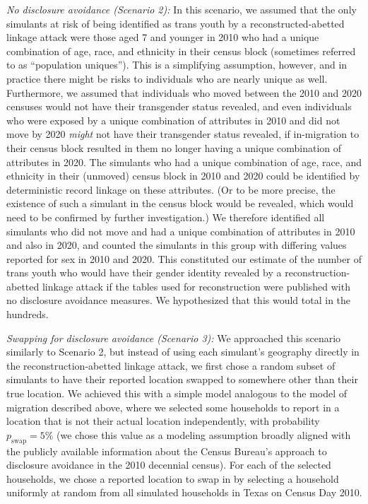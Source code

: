 \documentclass{jpc} %
\theoremstyle{plain}\newtheorem{satz}[thm]{Satz} %
\begin{document}
\emph{No disclosure avoidance (Scenario 2):} In this scenario, we assumed that the only simulants at risk of being identified as trans youth by a reconstructed-abetted linkage attack were those aged 7 and younger in 2010 who had a unique combination of age, race, and ethnicity in their census block (sometimes referred to as ``population uniques'').  This is a simplifying assumption, however, and in practice there might be risks to individuals who are nearly unique as well.  Furthermore, we assumed that individuals who moved between the 2010 and 2020 censuses would not have their transgender status revealed, and even individuals who were exposed by a unique combination of attributes in 2010 and did not move by 2020 \emph{might} not have their transgender status revealed, if in-migration to their census block resulted in them no longer having a unique combination of attributes in 2020.  The simulants who had a unique combination of age, race, and ethnicity in their (unmoved) census block in 2010 and 2020 could be identified by deterministic record linkage on these attributes. (Or to be more precise, the existence of such a simulant in the census block would be revealed, which would need to be confirmed by further investigation.)  We therefore identified all simulants who did not move and had a unique combination of attributes in 2010 and also in 2020, and counted the simulants in this group with differing values reported for sex in 2010 and 2020.  This constituted our estimate of the number of trans youth who would have their gender identity revealed by a reconstruction-abetted linkage attack if the tables used for reconstruction were published with no disclosure avoidance measures.
We hypothesized that this would total in the hundreds.

\emph{Swapping for disclosure avoidance (Scenario 3):} We approached this scenario similarly to Scenario 2, but instead of using each simulant's geography directly in the reconstruction-abetted linkage attack, we first chose a random subset of simulants to have their reported location swapped to somewhere other than their true location.  
We achieved this with a simple model analogous to the model of migration described above, where we selected some households to report in a location that is not their actual location independently, with probability $p_\text{swap} = 5\%$ (we chose this value as a modeling assumption broadly aligned with the  publicly available information about the Census Bureau's approach to disclosure avoidance in the 2010 decennial census).  For each of the selected households, we chose a reported location to swap in by selecting a household uniformly at random from all simulated households in Texas on Census Day 2010.
\end{document}
